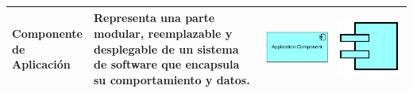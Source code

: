 \begin{longtable}{|p{0.15\linewidth}|p{0.45\linewidth}|p{0.2\linewidth} p{0.2\linewidth}|}
    Componente de Aplicación 
    &
    Representa una parte modular, reemplazable y desplegable de un sistema de software que encapsula su comportamiento y datos. 
    &
\begin{center}
    \includegraphics[width=1\linewidth]{imgs/capa_aplicacion/aplication_component.pdf}
\end{center} 
&
\begin{center}
    \includegraphics[width=0.5\linewidth]{imgs/capa_aplicacion/component.pdf}
\end{center}
    \\ \hline




\end{longtable}
